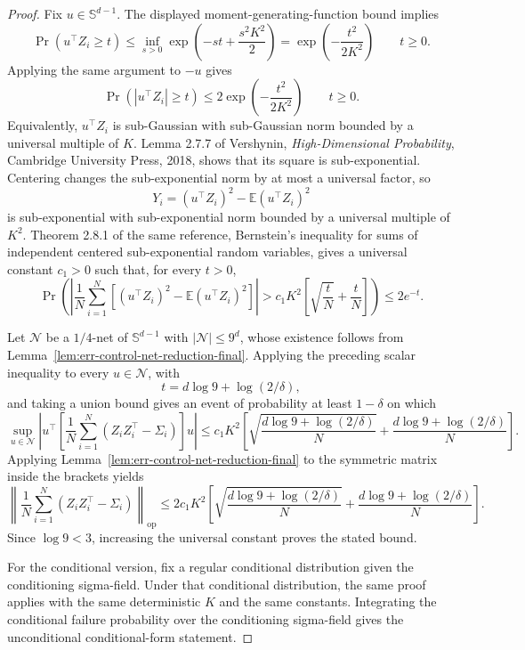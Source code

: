 \documentclass{article} %
\begin{document}
\begin{proof}
Fix \(u\in\mathbb{S}^{d-1}\).  The displayed moment-generating-function bound
implies
\[
\Pr(u^\top Z_i\ge t)
\le
\inf_{s>0}
\exp\!\left(-st+\frac{s^2K^2}{2}\right)
=
\exp\!\left(-\frac{t^2}{2K^2}\right)
\qquad t\ge0.
\]
Applying the same argument to \(-u\) gives
\[
\Pr(|u^\top Z_i|\ge t)
\le
2\exp\!\left(-\frac{t^2}{2K^2}\right)
\qquad t\ge0.
\]
Equivalently, \(u^\top Z_i\) is sub-Gaussian with sub-Gaussian norm bounded by
a universal multiple of \(K\). Lemma 2.7.7 of Vershynin,
\emph{High-Dimensional Probability}, Cambridge University Press, 2018, shows
that its square is sub-exponential. Centering changes the sub-exponential norm
by at most a universal factor, so
\[
Y_i=(u^\top Z_i)^2-\mathbb{E}(u^\top Z_i)^2
\]
is sub-exponential with sub-exponential norm bounded by a universal multiple of
\(K^2\).  Theorem 2.8.1 of the same reference, Bernstein's inequality for sums
of independent centered sub-exponential random variables, gives a universal
constant \(c_1>0\) such that, for every \(t>0\),
\[
\Pr\!\left(
\left|
\frac1N\sum_{i=1}^N
\left[
(u^\top Z_i)^2-\mathbb{E}(u^\top Z_i)^2
\right]
\right|
>
c_1K^2
\left[
\sqrt{\frac{t}{N}}+\frac{t}{N}
\right]
\right)
\le
2e^{-t}.
\]

Let \(\mathcal{N}\) be a \(1/4\)-net of \(\mathbb{S}^{d-1}\) with
\(|\mathcal{N}|\le 9^d\), whose existence follows from
Lemma~\ref{lem:err-control-net-reduction-final}.  Applying the preceding scalar
inequality to every \(u\in\mathcal{N}\), with
\[
t=d\log 9+\log(2/\delta),
\]
and taking a union bound gives an event of probability at least \(1-\delta\) on
which
\[
\sup_{u\in\mathcal{N}}
\left|
u^\top
\left[
\frac1N\sum_{i=1}^N
\left(Z_iZ_i^\top-\Sigma_i\right)
\right]
u
\right|
\le
c_1K^2
\left[
\sqrt{\frac{d\log 9+\log(2/\delta)}{N}}
+
\frac{d\log 9+\log(2/\delta)}{N}
\right].
\]
Applying Lemma~\ref{lem:err-control-net-reduction-final} to the symmetric matrix
inside the brackets yields
\[
\left\|
\frac1N\sum_{i=1}^N
\left(Z_iZ_i^\top-\Sigma_i\right)
\right\|_{\mathrm{op}}
\le
2c_1K^2
\left[
\sqrt{\frac{d\log 9+\log(2/\delta)}{N}}
+
\frac{d\log 9+\log(2/\delta)}{N}
\right].
\]
Since \(\log 9<3\), increasing the universal constant proves the stated bound.

For the conditional version, fix a regular conditional distribution given the
conditioning sigma-field.  Under that conditional distribution, the same proof
applies with the same deterministic \(K\) and the same constants.  Integrating
the conditional failure probability over the conditioning sigma-field gives the
unconditional conditional-form statement.
\end{proof}
\end{document}
